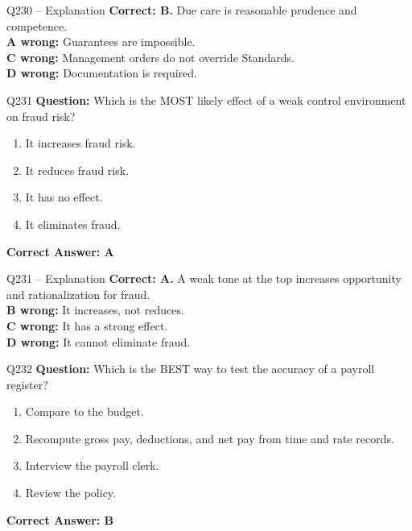 \documentclass[aspectratio=169,10pt]{beamer}
\begin{document}
	\begin{frame}[t]{Q230 -- Explanation}
		\small
		\textbf{Correct: B.} Due care is reasonable prudence and competence. \\[4pt]
		\textbf{A wrong:} Guarantees are impossible. \\[2pt]
		\textbf{C wrong:} Management orders do not override Standards. \\[2pt]
		\textbf{D wrong:} Documentation is required.
	\end{frame}
	
	\begin{frame}[t]{Q231}
		\small
		\textbf{Question:} Which is the MOST likely effect of a weak control environment on fraud risk?
		\begin{enumerate}[label=\Alph*.,itemsep=1pt,topsep=2pt]
			\item It increases fraud risk.
			\item It reduces fraud risk.
			\item It has no effect.
			\item It eliminates fraud.
		\end{enumerate}
		\vspace{4pt}
		\textbf{Correct Answer: A}
	\end{frame}
	
	\begin{frame}[t]{Q231 -- Explanation}
		\small
		\textbf{Correct: A.} A weak tone at the top increases opportunity and rationalization for fraud. \\[4pt]
		\textbf{B wrong:} It increases, not reduces. \\[2pt]
		\textbf{C wrong:} It has a strong effect. \\[2pt]
		\textbf{D wrong:} It cannot eliminate fraud.
	\end{frame}
	
	\begin{frame}[t]{Q232}
		\small
		\textbf{Question:} Which is the BEST way to test the accuracy of a payroll register?
		\begin{enumerate}[label=\Alph*.,itemsep=1pt,topsep=2pt]
			\item Compare to the budget.
			\item Recompute gross pay, deductions, and net pay from time and rate records.
			\item Interview the payroll clerk.
			\item Review the policy.
		\end{enumerate}
		\vspace{4pt}
		\textbf{Correct Answer: B}
	\end{frame}
	
\end{document}
